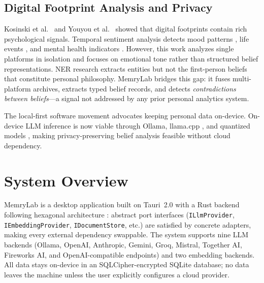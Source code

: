 \documentclass[pdflatex,sn-mathphys-num]{sn-jnl}
\begin{document}
\subsection{Digital Footprint Analysis and Privacy}

Kosinski et al.\ \cite{kosinski2013private} and Youyou et al.\ \cite{youyou2015computer} showed that digital footprints contain rich psychological signals. Temporal sentiment analysis detects mood patterns \cite{thelwall2012sentiment,golder2011diurnal}, life events \cite{li2014major}, and mental health indicators \cite{de2013social}. However, this work analyzes single platforms in isolation and focuses on emotional tone rather than structured belief representations. NER research \cite{li2020survey,yadav2018ner} extracts entities but not the first-person beliefs that constitute personal philosophy. MemryLab bridges this gap: it fuses multi-platform archives, extracts typed belief records, and detects \emph{contradictions between beliefs}---a signal not addressed by any prior personal analytics system.

The local-first software movement \cite{kleppmann2019localfirst} advocates keeping personal data on-device. On-device LLM inference is now viable through Ollama, llama.cpp \cite{gerganov2023llamacpp}, and quantized models \cite{dettmers2023qlora}, making privacy-preserving belief analysis feasible without cloud dependency.

\section{System Overview}\label{sec:architecture}

MemryLab is a desktop application built on Tauri~2.0 \cite{thompson2024tauri} with a Rust backend following hexagonal architecture \cite{cockburn2005hexagonal}: abstract port interfaces (\texttt{ILlmProvider}, \texttt{IEmbeddingProvider}, \texttt{IDocumentStore}, etc.) are satisfied by concrete adapters, making every external dependency swappable. The system supports nine LLM backends (Ollama, OpenAI, Anthropic, Gemini, Groq, Mistral, Together AI, Fireworks AI, and OpenAI-compatible endpoints) and two embedding backends. All data stays on-device in an SQLCipher-encrypted SQLite database; no data leaves the machine unless the user explicitly configures a cloud provider.
\end{document}
